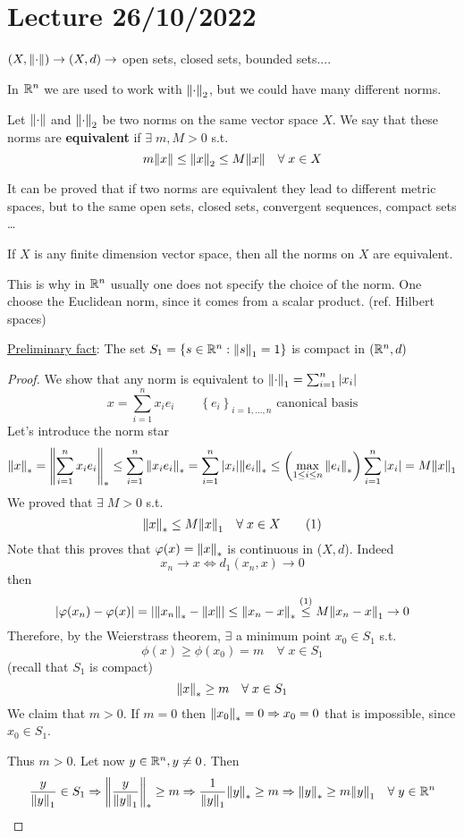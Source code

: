 \section{Lecture 26/10/2022}
\((X, \norm{\cdot}) \to (X, d) \to \) open sets, closed sets, bounded sets....

In \(\mathbb{R}^n\) we are used to work with \(\norm{\cdot}_2\), but we could have many different norms.
\begin{definition}
    Let \(\norm{\cdot}\) and \(\norm{\cdot}_2\) be two norms on the same vector space \(X\). We say that these norms are \textbf{equivalent} if \(\exists \; m, M >0\) s.t. 
    \[
        m\norm{x} \leq \norm{x}_2 \leq M\norm{x} \quad \forall\; x \in X
    \]
\end{definition}
It can be proved that if two norms are equivalent they lead to different metric spaces, but to the same open sets, closed sets, convergent sequences, compact sets \dots
\begin{theorem}
    If \(X\) is any finite dimension vector space, then all the norms on \(X\) are equivalent.
\end{theorem}
\begin{remark}
    This is why in \(\mathbb{R}^n\) usually one does not specify the choice of the norm. One choose the Euclidean norm, since it comes from a scalar product. (ref. Hilbert spaces)
\end{remark}
\noindent\underline{Preliminary fact}: The set \(S_1 = \left\{ s \in \mathbb{R}^n : \norm{s}_1  = 1\right\}\) is compact in \((\mathbb{R}^n, d)\)
\begin{proof}
    We show that any norm is equivalent to \(\norm{\cdot}_1 = \sum_{i=1}^n \abs{x_i}\)
    \[
        x = \sum_{i=1}^n x_i e_i \qquad \left\{ e_i \right\}_{i= 1,\ldots, n} \mbox{ canonical basis}
    \]
    Let's introduce the norm star 
    \[
        \norm{x}_* = \norm{\sum_{i=1}^n x_i e_i}_* 
        \leq \sum_{i=1}^n \norm{x_i e_i}_* = \sum_{i=1}^n \abs{x_i} \norm{e_i}_* 
        \leq \left(\max_{1 \leq i \leq n} \norm{e_i}_*\right) \sum_{i=1}^n \abs{x_i}
        = M \norm{x}_1
    \]
    We proved that \(\exists \; M> 0\) s.t.
    \[
        \norm{x}_* \leq M \norm{x}_1 \quad \forall \; x \in X \tag{1}
    \]
    Note that this proves that \(\varphi(x) = \norm{x}_*\) is continuous in (\(X, d\)). Indeed 
    \[
        x_n \to x \Leftrightarrow d_1(x_n, x) \to 0
    \]
    then 
    \[
        \abs{\varphi(x_n) - \varphi(x)} = \abs{\norm{x_n}_* -\norm{x}} \leq \norm{x_n - x}_* 
        \overset{(1)}{\leq} M\norm{x_n - x}_1 \to 0
    \]
    Therefore, by the Weierstrass theorem, \(\exists\) a minimum point \(x_0 \in S_1\) s.t. 
    \[
        \phi(x) \geq \phi(x_0) = m \quad \forall\; x \in S_1
    \]
    (recall that \(S_1\) is compact)
    \[
        \norm{x}_* \geq m \quad \forall \; x \in S_1
    \]
    We claim that \(m>0\). If \(m=0\) then \(\norm{x_0}_* = 0 \Rightarrow x_0  = 0\) that is impossible, since \(x_0 \in S_1\).

    Thus \(m>0\). Let now \(y \in \mathbb{R}^n, y \neq 0\). Then 
    \[
        \frac{y}{\norm{y}_1} \in S_1 
        \Rightarrow \norm{\frac{y}{\norm{y}_1}}_* \geq m 
        \Rightarrow \frac{1}{\norm{y}_1} \norm{y}_* \geq m 
        \Rightarrow \norm{y}_* \geq m \norm{y}_1 \quad \forall \; y \in \mathbb{R}^n 
    \]
\end{proof}

